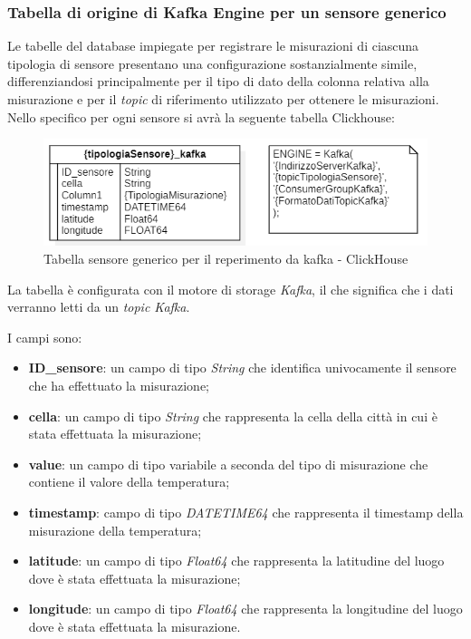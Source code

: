 \subsubsection{Tabella di origine di Kafka Engine per un sensore generico}
Le tabelle del database impiegate per registrare le misurazioni di ciascuna tipologia di sensore presentano una configurazione sostanzialmente simile, differenziandosi principalmente per il tipo di dato della colonna relativa alla misurazione e per il \textit{topic} di riferimento utilizzato per ottenere le misurazioni.
Nello specifico per ogni sensore si avrà la seguente tabella Clickhouse:
\begin{figure}[H]
    \centering
    \includegraphics[width=.6\textwidth]{../Images/SpecificaTecnica/sensorType_kafka.PNG}
    \caption{Tabella sensore generico per il reperimento da kafka - ClickHouse}
    \label{fig:sensorKafka}
  \end{figure}

    La tabella è configurata con il motore di storage \textit{Kafka}, il che significa che i dati verranno letti da un \textit{topic Kafka}. 

    I campi sono:
    \begin{itemize}
        \item \textbf{ID\_sensore}: un campo di tipo \textit{String} che identifica univocamente il sensore che ha effettuato la misurazione;
        \item \textbf{cella}: un campo di tipo \textit{String} che rappresenta la cella della città in cui è stata effettuata la misurazione;
        \item \textbf{value}: un campo di tipo variabile a seconda del tipo di misurazione che contiene il valore della temperatura;
        \item \textbf{timestamp}: campo di tipo \textit{DATETIME64} che rappresenta il timestamp della misurazione della temperatura;
        \item \textbf{latitude}: un campo di tipo \textit{Float64} che rappresenta la latitudine del luogo dove è stata effettuata la misurazione;
        \item \textbf{longitude}: un campo di tipo \textit{Float64} che rappresenta la longitudine del luogo dove è stata effettuata la misurazione.
    \end{itemize}

